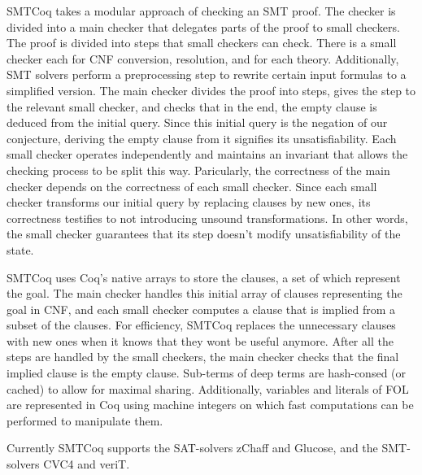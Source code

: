 \documentclass{article}
\begin{document}
	SMTCoq takes a modular approach of checking an
	SMT proof. The checker is divided into a main checker 
	that delegates parts of the proof to small checkers. 
	The proof is divided into steps that small checkers 
	can check. There is a small checker each for CNF 
	conversion, resolution, and for each theory. 
	Additionally, SMT solvers perform a preprocessing 
	step to rewrite certain input formulas to 
	a simplified version. The main checker divides the 
	proof into steps, gives the step to the relevant 
	small checker, and checks that in the 
	end, the empty clause is deduced from the initial query.
	Since this initial query is the negation of our 
	conjecture, deriving the empty clause from it 
	signifies its unsatisfiability. Each small checker 
	operates independently and maintains an invariant 
	that allows the checking process to be split this way.
	Paricularly, the correctness of the main checker 
	depends on the correctness of each small checker.
	Since each small checker transforms our initial 
	query by replacing clauses by new ones, its 
	correctness testifies to not introducing 
	unsound transformations. In other words, the 
	small checker guarantees that its step doesn't 
	modify unsatisfiability of the state.
	
	SMTCoq uses Coq's native arrays to store the clauses, 
	a set of which represent the goal. The main checker 
	handles this initial array of clauses representing the 
	goal in CNF, and each small checker computes a 
	clause that is implied from a subset of the clauses.
	For efficiency, SMTCoq replaces the unnecessary 
	clauses with new ones when it knows that they 
	wont be useful anymore. After all the steps 
	are handled by the small checkers, the main 
	checker checks that the final implied clause is 
	the empty clause. Sub-terms of deep terms 
	are hash-consed (or cached) to allow for maximal 
	sharing. Additionally, variables and literals 
	of FOL are represented in Coq using machine 
	integers on which fast computations can be 
	performed to manipulate them.
	
	Currently SMTCoq supports the SAT-solvers 
	zChaff and Glucose, and the SMT-solvers CVC4 and 
	veriT. 
	
\end{document}
